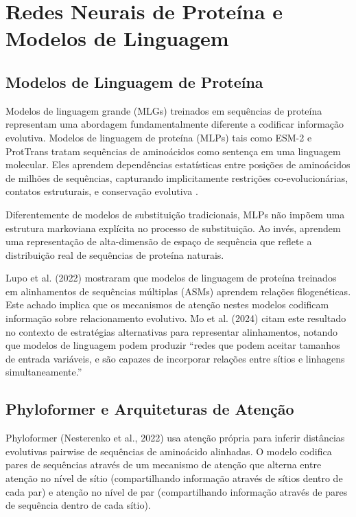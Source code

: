 \section{Redes Neurais de Proteína e Modelos de Linguagem}

\subsection{Modelos de Linguagem de Proteína}

Modelos de linguagem grande (MLGs) treinados em sequências de proteína representam uma abordagem fundamentalmente diferente a codificar informação evolutiva. Modelos de linguagem de proteína (MLPs) tais como ESM-2 e ProtTrans tratam sequências de aminoácidos como sentença em uma linguagem molecular. Eles aprendem dependências estatísticas entre posições de aminoácidos de milhões de sequências, capturando implicitamente restrições co-evolucionárias, contatos estruturais, e conservação evolutiva \parencite{valentini2023}.

Diferentemente de modelos de substituição tradicionais, MLPs não impõem uma estrutura markoviana explícita no processo de substituição. Ao invés, aprendem uma representação de alta-dimensão de espaço de sequência que reflete a distribuição real de sequências de proteína naturais.

Lupo et al. (2022) mostraram que modelos de linguagem de proteína treinados em alinhamentos de sequências múltiplas (ASMs) aprendem relações filogenéticas. Este achado implica que os mecanismos de atenção nestes modelos codificam informação sobre relacionamento evolutivo. Mo et al. (2024) citam este resultado no contexto de estratégias alternativas para representar alinhamentos, notando que modelos de linguagem podem produzir ``redes que podem aceitar tamanhos de entrada variáveis, e são capazes de incorporar relações entre sítios e linhagens simultaneamente.''

\subsection{Phyloformer e Arquiteturas de Atenção}

Phyloformer (Nesterenko et al., 2022) usa atenção própria para inferir distâncias evolutivas pairwise de sequências de aminoácido alinhadas. O modelo codifica pares de sequências através de um mecanismo de atenção que alterna entre atenção no nível de sítio (compartilhando informação através de sítios dentro de cada par) e atenção no nível de par (compartilhando informação através de pares de sequência dentro de cada sítio).

